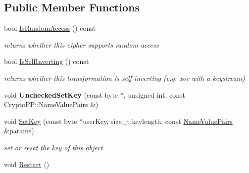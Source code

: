 \subsection*{Public Member Functions}
\begin{DoxyCompactItemize}
\item 
\hypertarget{class_authenticated_symmetric_cipher_base_a0913986395f646216926c2febfcdb8b7}{
bool \hyperlink{class_authenticated_symmetric_cipher_base_a0913986395f646216926c2febfcdb8b7}{IsRandomAccess} () const }
\label{class_authenticated_symmetric_cipher_base_a0913986395f646216926c2febfcdb8b7}

\begin{DoxyCompactList}\small\item\em returns whether this cipher supports random access \item\end{DoxyCompactList}\item 
\hypertarget{class_authenticated_symmetric_cipher_base_a8a54f13c52f2ed9af9fa7123fd59b5d7}{
bool \hyperlink{class_authenticated_symmetric_cipher_base_a8a54f13c52f2ed9af9fa7123fd59b5d7}{IsSelfInverting} () const }
\label{class_authenticated_symmetric_cipher_base_a8a54f13c52f2ed9af9fa7123fd59b5d7}

\begin{DoxyCompactList}\small\item\em returns whether this transformation is self-\/inverting (e.g. xor with a keystream) \item\end{DoxyCompactList}\item 
\hypertarget{class_authenticated_symmetric_cipher_base_a42dc8ab0d997e2065ed2e919b1c25e39}{
void {\bfseries UncheckedSetKey} (const byte $\ast$, unsigned int, const CryptoPP::NameValuePairs \&)}
\label{class_authenticated_symmetric_cipher_base_a42dc8ab0d997e2065ed2e919b1c25e39}

\item 
void \hyperlink{class_authenticated_symmetric_cipher_base_aea1353c1d0a94c3f81ebcf53f6b7ea57}{SetKey} (const byte $\ast$userKey, size\_\-t keylength, const \hyperlink{class_name_value_pairs}{NameValuePairs} \&params)
\begin{DoxyCompactList}\small\item\em set or reset the key of this object \item\end{DoxyCompactList}\item 
\hypertarget{class_authenticated_symmetric_cipher_base_a5c6a2964ef0bae2428347f180f76256e}{
void \hyperlink{class_authenticated_symmetric_cipher_base_a5c6a2964ef0bae2428347f180f76256e}{Restart} ()}
\label{class_authenticated_symmetric_cipher_base_a5c6a2964ef0bae2428347f180f76256e}


\end{DoxyCompactItemize}
